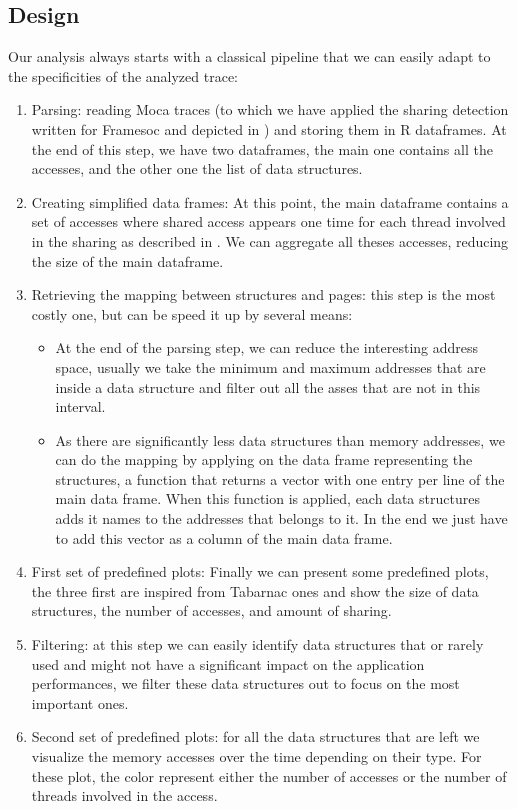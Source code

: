 \subsection{Design}

Our analysis always starts with a classical pipeline that we can easily adapt to the specificities of the analyzed trace:
\begin{enumerate}
    \item Parsing: reading \gls{Moca} traces (to which we have applied the sharing detection written for \gls{Framesoc} and depicted in )
        and storing them in \gls{R} dataframes.
        At the end of this step, we have two dataframes, the main one contains all the accesses, and the other one the list of data structures.
    \item Creating simplified data frames: At this point, the main dataframe contains a set of accesses where shared access appears one time for each thread involved in the sharing as described in .
        We can aggregate all theses accesses, reducing the size of the main dataframe.
    \item Retrieving the mapping between structures and pages: this step is the most costly one, but can be speed it up by several means:
        \begin{itemize}
            \item At the end of the parsing step, we can reduce the interesting address space, usually we take the minimum and maximum addresses that are inside a data structure and filter out all the asses that are not in this interval.
            \item As there are significantly less data structures than memory addresses, we can do the mapping by applying on the data frame representing the structures, a function that returns a vector with one entry per line of the main data frame.
                When this function is applied, each data structures adds it names to the addresses that belongs to it.
                In the end we just have to add this vector as a column of the main data frame.
        \end{itemize}
    \item First set of predefined plots: Finally we can present some predefined  plots, the three first are inspired from \gls{Tabarnac} ones and show the size of data structures, the number of accesses, and amount of sharing.
    \item  Filtering: at this step we can easily identify data structures that or rarely used and might not have a significant impact on the application performances, we filter these data structures out to focus on the most important ones.
    \item Second set of predefined plots: for all the data structures that are left we visualize the memory accesses over the time depending on their type.
        For these plot, the color represent either the number of accesses or the number of threads involved in the access.
\end{enumerate}
